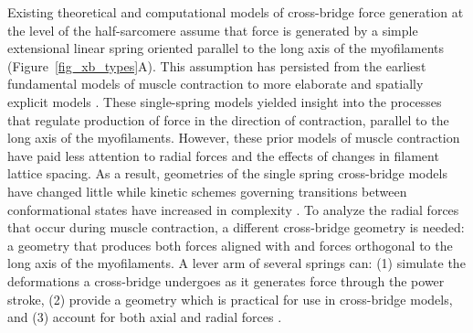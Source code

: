 \documentclass[10pt]{article}
\newcommand{\citep}[1]{\cite{#1}} %
\begin{document}
Existing theoretical and computational models of cross-bridge force generation at the level of the half-sarcomere assume that force is generated by a simple extensional linear spring oriented parallel to the long axis of the myofilaments (Figure~\ref{fig_xb_types}A). 
This assumption has persisted from the earliest fundamental models of muscle contraction to more elaborate and spatially explicit models \citep{Huxley1957, Daniel1998, Chase2004, Tanner2007, Campbell2009}.  
These single-spring models yielded insight into the processes that regulate production of force in the direction of contraction, parallel to the long axis of the myofilaments.
However, these prior models of muscle contraction have paid less attention to radial forces and the effects of changes in filament lattice spacing. 
As a result, geometries of the single spring cross-bridge models have changed little while kinetic schemes governing transitions between conformational states have increased in complexity \citep{Huxley1957, Pate1989, Daniel1998, Smith2008a}. 
To analyze the radial forces that occur during muscle contraction, a different cross-bridge geometry is needed: a geometry that produces both forces aligned with and forces orthogonal to the long axis of the myofilaments. 
A lever arm of several springs can: (1) simulate the deformations a cross-bridge undergoes as it generates force through the power stroke, (2) provide a geometry which is practical for use in cross-bridge models, and (3) account for both axial and radial forces \citep{Houdusse2001}.  
\end{document}
